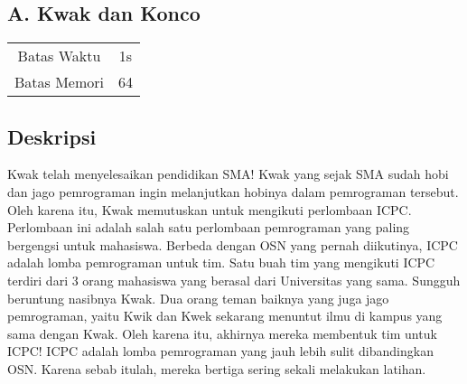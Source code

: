 \documentclass{article}
\begin{document}
\begin{center}
    \section*{A. Kwak dan Konco} %

    \begin{tabular}{ | c c | }
        \hline
        Batas Waktu  & 1s \\    %
        Batas Memori & 64 \\  %
        \hline
    \end{tabular}
\end{center}

\subsection*{Deskripsi}



Kwak telah menyelesaikan pendidikan SMA! Kwak yang sejak SMA sudah hobi dan jago pemrograman ingin melanjutkan hobinya dalam pemrograman tersebut. Oleh karena itu, Kwak memutuskan untuk mengikuti perlombaan ICPC. Perlombaan ini adalah salah satu perlombaan pemrograman yang paling bergengsi untuk mahasiswa.
Berbeda dengan OSN yang pernah diikutinya, ICPC adalah lomba pemrograman untuk tim. Satu buah tim yang mengikuti ICPC terdiri dari 3 orang mahasiswa yang berasal dari Universitas yang sama. Sungguh beruntung nasibnya Kwak. Dua orang teman baiknya yang juga jago pemrograman, yaitu Kwik dan Kwek sekarang menuntut ilmu di kampus yang sama dengan Kwak. Oleh karena itu, akhirnya mereka membentuk tim untuk ICPC!
ICPC adalah lomba pemrograman yang jauh lebih sulit dibandingkan OSN. Karena sebab itulah, mereka bertiga sering sekali melakukan latihan.
\end{document}
